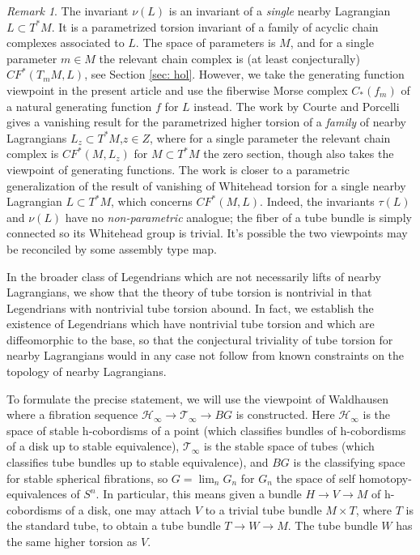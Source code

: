 \documentclass{amsart}
\newcommand\cH{\mathcal{H}}
\newcommand\cT{\mathcal{T}}
\theoremstyle{definition}
\theoremstyle{remark}
\newtheorem{inductive lemma}[theorem]{Inductive Lemma}
\newtheorem{remark}[theorem]{Remark}
\begin{document}
\begin{remark}
The invariant $\nu(L)$ is an invariant of a {\em single} nearby Lagrangian $L \subset T^*M$. It is a parametrized torsion invariant of a family of acyclic chain complexes associated to $L$. The space of parameters is $M$, and for a single parameter $m \in M$ the relevant chain complex is (at least conjecturally) $CF^*(T_mM,L)$, see Section \ref{sec: hol}. However, we take the generating function viewpoint in the present article and use the fiberwise Morse complex $C_*(f_m)$ of a natural generating function $f$ for $L$ instead. The work by Courte and Porcelli \cite{CP25} gives a vanishing result for the parametrized higher torsion of a {\em family} of nearby Lagrangians $L_z \subset T^*M$,$z \in Z$, where for a single parameter the relevant chain complex is $CF^*(M,L_z)$ for $M \subset T^*M$ the zero section, though \cite{CP25} also takes the viewpoint of generating functions. The work \cite{CP25} is closer to a parametric generalization of the result \cite{AK} of vanishing of Whitehead torsion for a single nearby Lagrangian $L \subset T^*M$, which concerns $CF^*(M,L)$. Indeed, the invariants $\tau(L)$ and $\nu(L)$ have no {\em non-parametric} analogue; the fiber of a tube bundle is simply connected so its Whitehead group is trivial. It's possible the two viewpoints may be reconciled by some assembly type map.  
\end{remark}

In the broader class of Legendrians which are not necessarily lifts of nearby Lagrangians, we show that the theory of tube torsion is nontrivial in that Legendrians with nontrivial tube torsion abound. In fact, we establish the existence of Legendrians which have nontrivial tube torsion and which are diffeomorphic to the base, so that the conjectural triviality of tube torsion for nearby Lagrangians would in any case not follow from known constraints on the topology of nearby Lagrangians.

To formulate the precise statement, we will use the viewpoint of Waldhausen \cite{W82} where a fibration sequence $\cH_\infty \to \cT_\infty \to BG$ is constructed. Here $\cH_\infty$ is the space of stable h-cobordisms of a point (which classifies bundles of h-cobordisms of a disk up to stable equivalence), $\cT_\infty$ is the stable space of tubes (which classifies tube bundles up to stable equivalence), and $BG$ is the classifying space for stable spherical fibrations, so $G=\lim_n G_n$ for $G_n$ the space of self homotopy-equivalences of $S^n$. In particular, this means given a bundle $H \to V \to M$ of h-cobordisms of a disk, one may attach $V$ to a trivial tube bundle $M \times T$, where $T$ is the standard tube, to obtain a tube bundle $T \to W \to M$. The tube bundle $W$ has the same higher torsion as $V$. 
\end{document}
